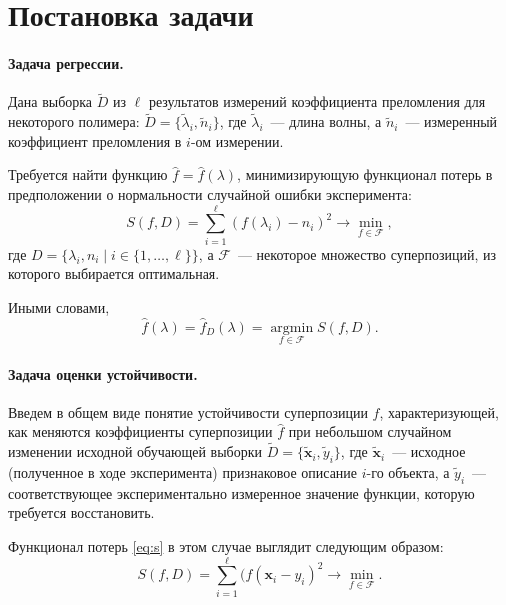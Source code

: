 \documentclass[12pt,a4paper]{article}
\theoremstyle{definition}
\begin{document}
\section{Постановка задачи}

\paragraph{Задача регрессии.}
Дана выборка $\tilde{D}$ из $\ell$ результатов измерений коэффициента
преломления для некоторого полимера:
$\tilde{D} = \{ \tilde{\lambda}_i, \tilde{n}_i \}$, где $\tilde{\lambda}_i$~--- длина волны,
а $\tilde{n}_i$~--- измеренный коэффициент преломления в $i$-ом измерении.

Требуется найти функцию $\hat{f} = \hat{f}(\lambda)$, минимизирующую функционал
потерь в предположении о нормальности случайной ошибки эксперимента:
\begin{equation}
  S(f, D) = \sum_{i = 1}^\ell (f(\lambda_i) - n_i)^2 \rightarrow \min_{f \in \mathcal{F}},
  \label{eq:s}
\end{equation}
где $D = \{ \lambda_i, n_i \mid i \in \{ 1, \dots, \ell \} \}$, а $\mathcal{F}$~---
некоторое множество суперпозиций, из которого выбирается оптимальная.

Иными словами,
\begin{equation}
  \hat{f}(\lambda) = \hat{f}_D(\lambda) = \mathop{\arg \min}\limits_{f \in \mathcal{F}} S(f, D).
  \label{eq:fhat}
\end{equation}

\paragraph{Задача оценки устойчивости.}
Введем в общем виде понятие устойчивости суперпозиции $f$, характеризующей,
как меняются коэффициенты суперпозиции $\hat{f}$ при небольшом случайном
изменении исходной обучающей выборки
$\tilde{D} = \{ \tilde{\mathbf{x}}_i, \tilde{y}_i \}$,
где $\tilde{\mathbf{x}}_i$~--- исходное (полученное в ходе эксперимента)
признаковое описание $i$-го объекта, а $\tilde{y}_i$~--- соответствующее экспериментально
измеренное значение функции, которую требуется восстановить.

Функционал потерь \eqref{eq:s} в этом случае выглядит следующим образом: 
\begin{equation}
  S(f, D) = \sum_{i = 1}^\ell (f(\mathbf{x}_i - y_i)^2 \rightarrow \min_{f \in \mathcal{F}}.
  \label{eq:s_common}
\end{equation}
\end{document}
